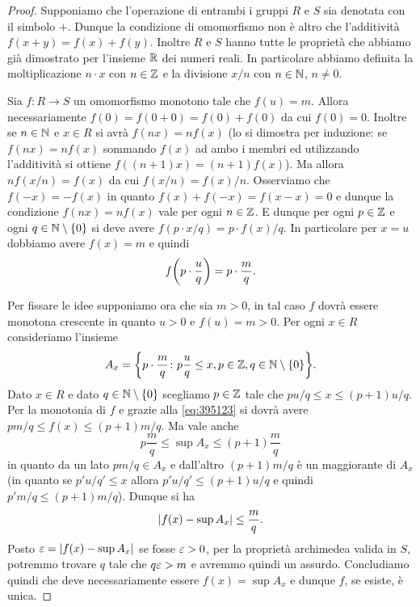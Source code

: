\begin{proof}
Supponiamo che l'operazione di entrambi i gruppi $R$ e $S$ sia denotata 
con il simbolo $+$. Dunque la condizione di omomorfismo non è altro 
che l'additività $f(x+y) = f(x) + f(y)$.
Inoltre $R$ e $S$ hanno tutte le proprietà che abbiamo già dimostrato 
per l'insieme ${\mathbb R}$ dei numeri reali. 
In particolare abbiamo definita la moltiplicazione $n\cdot x$ 
con $n\in {\mathbb Z}$ e la divisione $x/n$ con $n\in {\mathbb N}$, $n\neq 0$.

Sia $f\colon R\to S$ un omomorfismo monotono
tale che $f(u) = m$.
Allora necessariamente $f(0) = f(0+0) = f(0)+f(0)$ da cui $f(0)=0$.
Inoltre se $n\in {\mathbb N}$ e $x\in R$ si avrà $f(nx) = nf(x)$
(lo si dimostra per induzione: se $f(nx)=nf(x)$ sommando 
$f(x)$ ad ambo i membri ed utilizzando l'additività si 
ottiene $f((n+1)x) = (n+1)f(x)$).
Ma allora $n f(x/n) = f(x)$ da cui $f(x/n) = f(x)/n$. 
Osserviamo che $f(-x) = -f(x)$ in quanto $f(x) + f(-x) = f(x-x) = 0$
e dunque la condizione $f(nx)=nf(x)$ vale per ogni $n\in {\mathbb Z}$.
E dunque per ogni $p\in {\mathbb Z}$ e ogni $q\in {\mathbb N}\setminus{\left\{ 0 \right\}}$ si 
deve avere $f(p\cdot x/q) = p\cdot f(x) /q$. 
In particolare per $x=u$ dobbiamo avere $f(x)=m$ e quindi 
\begin{equation}\label{eq:395123}
    f{\left( p\cdot \frac{u}{q} \right)} = p\cdot\frac{m}{q}.
\end{equation}

Per fissare le idee supponiamo ora che sia $m>0$, in tal caso 
$f$ dovrà essere monotona crescente in quanto $u>0$ e $f(u)=m>0$.
Per ogni $x\in R$ consideriamo l'insieme 
\[
A_x = {\left\{ p\cdot \frac{m}{q}\colon p \frac{u}{q} \le x, 
p\in {\mathbb Z}, q \in {\mathbb N}\setminus{\left\{ 0 \right\}} \right\}}.
\]
Dato $x\in R$ e dato $q\in {\mathbb N}\setminus{\left\{ 0 \right\}}$ scegliamo $p\in {\mathbb Z}$ 
tale che $pu/q \le x \le (p+1)u/q$. 
Per la monotonia di $f$ e grazie alla \eqref{eq:395123} 
si dovrà avere $pm/q \le f(x) \le (p+1)m/q$.
Ma vale anche 
\begin{equation}\label{eq:452067}
p\frac m q \le \sup A_x \le (p+1)\frac m q
\end{equation}
in quanto da un lato $pm/q \in A_x$ e dall'altro $(p+1)m/q$ 
è un maggiorante di $A_x$ (in quanto se $p' u/q' \le x$ allora 
$p'u/q' \le (p+1)u/q$ e quindi $p'm/q \le (p+1)m/q$).
Dunque si ha 
\[
 {\left|f(x) - \sup A_x\right|} \le \frac m q.
\]
Posto $\varepsilon = {\left|f(x)- \sup A_x\right|}$ se fosse $\varepsilon>0$, 
per la proprietà archimedea valida in $S$,
potremmo trovare $q$ tale che $q\varepsilon>m$ e avremmo quindi un 
assurdo.
Concludiamo quindi che deve necessariamente essere $f(x) = \sup A_x$
e dunque $f$, se esiste, è unica.


\end{proof}
